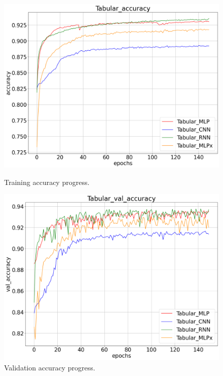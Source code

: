 \begin{figure}[!ht]
    \centering
    \begin{minipage}{0.48\textwidth}
        \centering
        \includegraphics[width=\linewidth]{obrazky-figures/Tabular_experiment/accuracy_2023-03-23_15:04:45.png}
        \caption{Training accuracy progress.}
        \label{graph-tabular-accuracy}
    \end{minipage}\hfill
    \begin{minipage}{0.48\textwidth}
        \centering
        \includegraphics[width=\linewidth]{obrazky-figures/Tabular_experiment/val_accuracy_2023-03-23_15:04:45.png}
        \caption{Validation accuracy progress.}
        \label{graph-tabular-val_accuracy}
    \end{minipage}
\end{figure}
